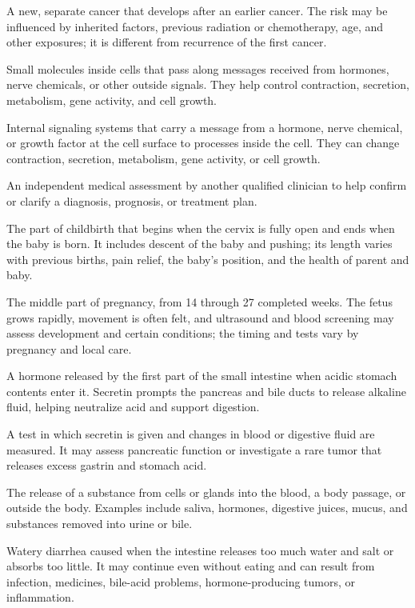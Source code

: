  A new, separate cancer that develops after an earlier cancer. The risk may be influenced by inherited factors, previous radiation or chemotherapy, age, and other exposures; it is different from recurrence of the first cancer.

 Small molecules inside cells that pass along messages received from hormones, nerve chemicals, or other outside signals. They help control contraction, secretion, metabolism, gene activity, and cell growth.

 Internal signaling systems that carry a message from a hormone, nerve chemical, or growth factor at the cell surface to processes inside the cell. They can change contraction, secretion, metabolism, gene activity, or cell growth.

 An independent medical assessment by another qualified clinician to help confirm or clarify a diagnosis, prognosis, or treatment plan.

 The part of childbirth that begins when the cervix is fully open and ends when the baby is born. It includes descent of the baby and pushing; its length varies with previous births, pain relief, the baby’s position, and the health of parent and baby.

 The middle part of pregnancy, from 14 through 27 completed weeks. The fetus grows rapidly, movement is often felt, and ultrasound and blood screening may assess development and certain conditions; the timing and tests vary by pregnancy and local care.

 A hormone released by the first part of the small intestine when acidic stomach contents enter it. Secretin prompts the pancreas and bile ducts to release alkaline fluid, helping neutralize acid and support digestion.

 A test in which secretin is given and changes in blood or digestive fluid are measured. It may assess pancreatic function or investigate a rare tumor that releases excess gastrin and stomach acid.

 The release of a substance from cells or glands into the blood, a body passage, or outside the body. Examples include saliva, hormones, digestive juices, mucus, and substances removed into urine or bile.

 Watery diarrhea caused when the intestine releases too much water and salt or absorbs too little. It may continue even without eating and can result from infection, medicines, bile-acid problems, hormone-producing tumors, or inflammation.

